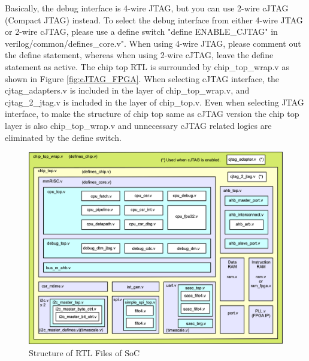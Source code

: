 Basically, the debug interface is 4-wire JTAG, but you can use 2-wire cJTAG (Compact JTAG) instead. To select the debug interface from either 4-wire JTAG or 2-wire cJTAG, please use a define switch "\textasciigrave define ENABLE\_CJTAG" in verilog/common/defines\_core.v". When using 4-wire JTAG, please comment out the \textasciigrave define statement, whereas when using 2-wire cJTAG, leave the \textasciigrave define statement as active. The chip top RTL is surrounded by chip\_top\_wrap.v as shown in Figure \ref{fig:cJTAG_FPGA}. When selecting cJTAG interface, the cjtag\_adapters.v is included in the layer of chip\_top\_wrap.v, and cjtag\_2\_jtag.v is included in the layer of chip\_top.v. Even when selecting JTAG interface, to make the structure of chip top same as cJTAG version the chip top layer is also chip\_top\_wrap.v and unnecessary cJTAG related logics are eliminated by the \textasciigrave define switch.

\begin{figure}[H]
    \includegraphics[width=1.0\columnwidth]{./Figure/CHIPRTLStructure.png}
    \caption{Structure of RTL Files of SoC}
    \label{fig:CHIPRTLSTRUCTURE}
\end{figure}

